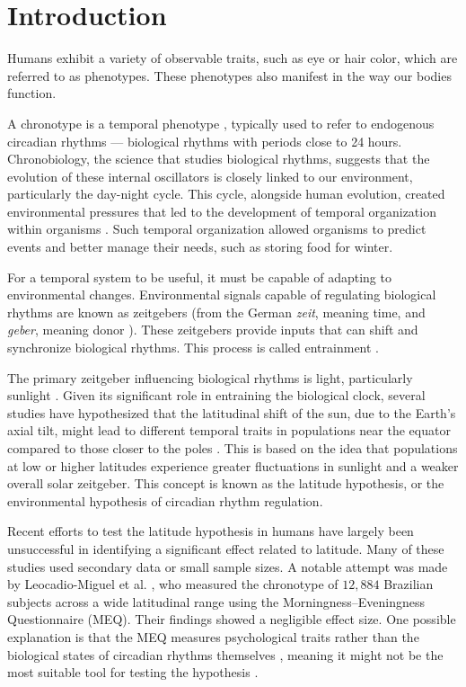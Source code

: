 \documentclass[
12pt,
openright,
oneside,
a4paper,
chapter=TITLE,
section=TITLE,
french,
spanish,
brazil,
english
]{abntex2}\usepackage{array}
\begin{document}
\section{Introduction}\label{introduction-1}

Humans exhibit a variety of observable traits, such as eye or hair
color, which are referred to as phenotypes. These phenotypes also
manifest in the way our bodies function.

A chronotype is a temporal phenotype
\autocite{ehret1974,pittendrigh1993}, typically used to refer to
endogenous circadian rhythms --- biological rhythms with periods close
to 24 hours. Chronobiology, the science that studies biological rhythms,
suggests that the evolution of these internal oscillators is closely
linked to our environment, particularly the day-night cycle. This cycle,
alongside human evolution, created environmental pressures that led to
the development of temporal organization within organisms
\autocite{aschoff1989,paranjpe2005}. Such temporal organization allowed
organisms to predict events and better manage their needs, such as
storing food for winter.

For a temporal system to be useful, it must be capable of adapting to
environmental changes. Environmental signals capable of regulating
biological rhythms are known as zeitgebers (from the German \emph{zeit},
meaning time, and \emph{geber}, meaning donor
\autocite{cambridgeuniversitypress}). These zeitgebers provide inputs
that can shift and synchronize biological rhythms. This process is
called entrainment \autocite{roenneberg2003a,roenneberg2010}.

The primary zeitgeber influencing biological rhythms is light,
particularly sunlight \autocite{aschoff1972}. Given its significant role
in entraining the biological clock, several studies have hypothesized
that the latitudinal shift of the sun, due to the Earth's axial tilt,
might lead to different temporal traits in populations near the equator
compared to those closer to the poles
\autocite{bohlen1973,pittendrigh1991,roenneberg2003,randler2008,hut2013,leocadio-miguel2017,randler2017}.
This is based on the idea that populations at low or higher latitudes
experience greater fluctuations in sunlight and a weaker overall solar
zeitgeber. This concept is known as the latitude hypothesis, or the
environmental hypothesis of circadian rhythm regulation.

Recent efforts to test the latitude hypothesis in humans have largely
been unsuccessful in identifying a significant effect related to
latitude. Many of these studies used secondary data or small sample
sizes. A notable attempt was made by Leocadio-Miguel et al.
\autocite*{leocadio-miguel2017}, who measured the chronotype of
\(12,884\) Brazilian subjects across a wide latitudinal range using the
Morningness--Eveningness Questionnaire (MEQ). Their findings showed a
negligible effect size. One possible explanation is that the MEQ
measures psychological traits rather than the biological states of
circadian rhythms themselves \autocite{roenneberg2019}, meaning it might
not be the most suitable tool for testing the hypothesis
\autocite{leocadio-miguel2014}.
\end{document}

